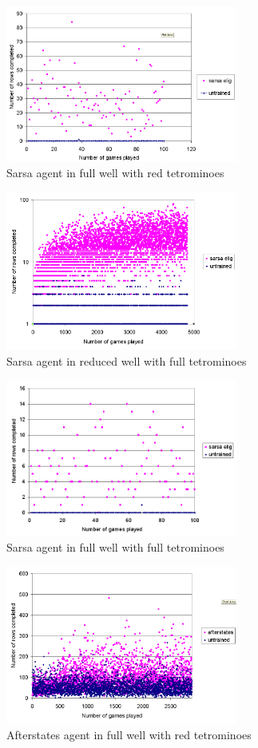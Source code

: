 \documentclass{rucsthesis}
\begin{document}
\begin{figure}[h]
\centering
\includegraphics[width=3in]{sarsaeligredtetfullwell.png}
\caption{Sarsa agent in full well with red tetrominoes}
\label{fig:sarsaeligredtetfullwell}
\end{figure}

\begin{figure}[h]
\centering
\includegraphics[width=3in]{sarsaeligfulltetredwell.png}
\caption{Sarsa agent in reduced well with full tetrominoes}
\label{fig:sarsaeligfulltetredwell}
\end{figure}

\begin{figure}[h]
\centering
\includegraphics[width=3in]{sarsaeligfulltetfullwell.png}
\caption{Sarsa agent in full well with full tetrominoes}
\label{fig:sarsaeligfulltetfullwell}
\end{figure}

\begin{figure}[h]
\centering
\includegraphics[width=3in]{afterstatesheightredtetfullwell.png}
\caption{Afterstates agent in full well with red tetrominoes}
\label{fig:afterstatesheightredtetfullwell}
\end{figure}
\end{document}
